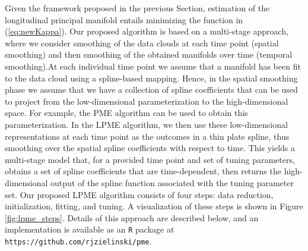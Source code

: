 \documentclass[11pt,reqno]{article}
\theoremstyle{definition}
\begin{document}
Given the framework proposed in the previous Section, estimation of the longitudinal principal manifold entails minimizing the function in (\ref{eq:newKappa}). Our proposed algorithm is based on a multi-stage approach, where we consider smoothing of the data clouds at each time point (spatial smoothing) and then smoothing of the obtained manifolds over time (temporal smoothing).At each individual time point we assume that a manifold has been fit to the data cloud using a spline-based mapping. Hence, in the spatial smoothing phase we assume that we have a collection of spline coefficients that can be used to project from the low-dimensional parameterization to the high-dimensional space. For example, the PME algorithm can be used to obtain this parameterization. In the LPME algorithm, we then use these low-dimensional representations at each time point as the outcomes in a thin plate spline, thus smoothing over the spatial spline coefficients with respect to time. This yields a multi-stage model that, for a provided time point and set of tuning parameters, obtains a set of spline coefficients that are time-dependent, then returns the high-dimensional output of the spline function associated with the tuning parameter set. Our proposed LPME algorithm consists of four steps: data reduction, initialization, fitting, and tuning. A visualization of these steps is shown in Figure \ref{fig:lpme_steps}. Details of this approach are described below, and an implementation is available as an \texttt{R} package at \texttt{https://github.com/rjzielinski/pme}.
\end{document}
